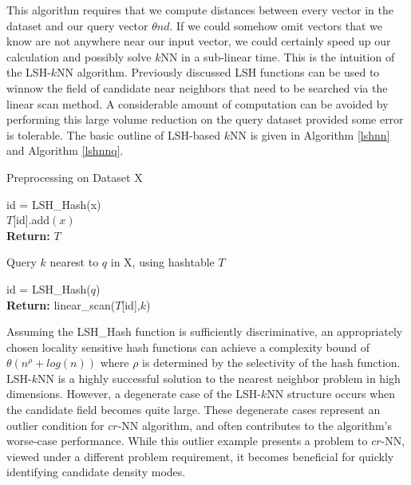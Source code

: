 This algorithm requires that we compute distances between every vector in the dataset and our query vector $\theta{nd}$.
If we could somehow omit vectors that we know are not anywhere near our input vector, we could certainly speed up our
calculation and possibly solve $k$NN in a sub-linear time.  This is the intuition of the LSH-$k$NN algorithm.
Previously discussed LSH functions can be used to winnow the field of candidate near neighbors that need to be searched
via the linear scan method. A considerable amount of computation can be avoided by performing this large volume
reduction on the query dataset provided some error is tolerable.  The basic outline of LSH-based $k$NN is given in
Algorithm \ref{lshnn} and Algorithm \ref{lshnnq}.

\begin{algorithm}
\caption{Preprocessing on Dataset X \label{lshnn}}
\DontPrintSemicolon
{} 
{	id = LSH\_Hash(x)\\
	$T$[id].add$(x)$\\
}
\textbf{Return:} $T$
\end{algorithm}
\begin{algorithm}
\caption{Query $k$ nearest to $q$ in X, using hashtable $T$\label{lshnnq}}
\DontPrintSemicolon
id = LSH\_Hash($q$)\\
\textbf{Return:} linear\_scan($T$[id],$k$)\\
\end{algorithm}

Assuming the LSH\_Hash function is sufficiently discriminative, an appropriately chosen locality sensitive hash
functions can achieve a complexity bound of $\theta(n^\rho+log(n))$ where $\rho$ is determined by the selectivity of the
hash function.  LSH-$k$NN is a highly successful solution to the nearest neighbor problem in high dimensions.  However,
a degenerate case of the LSH-$k$NN structure occurs when the candidate field becomes quite large.  These degenerate
cases represent an outlier condition for $cr$-NN algorithm, and often contributes to the algorithm's worse-case
performance.  While this outlier example presents a problem to $cr$-NN, viewed under a different problem requirement, it
becomes beneficial for quickly identifying candidate density modes.

